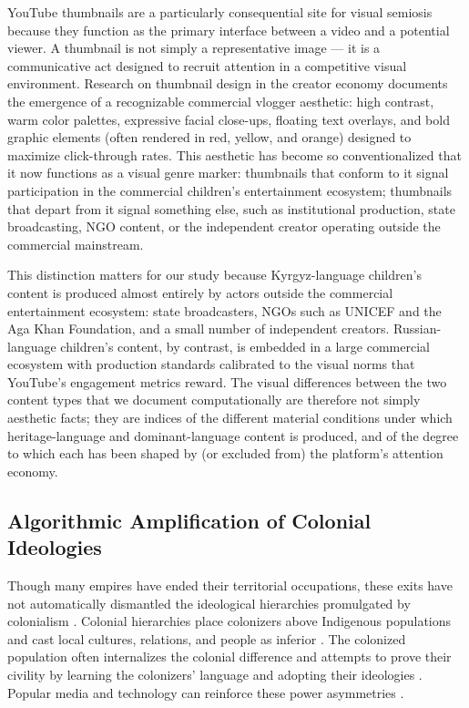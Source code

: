 \documentclass[12pt, letterpaper]{article}
\begin{document}
YouTube thumbnails are a particularly consequential site for visual semiosis because they
function as the primary interface between a video and a potential viewer. A thumbnail is not
simply a representative image --- it is a communicative act designed to recruit attention in
a competitive visual environment. Research on thumbnail design in the creator economy
documents the emergence of a recognizable commercial vlogger aesthetic: high contrast, warm
color palettes, expressive facial close-ups, floating text overlays, and bold graphic elements
(often rendered in red, yellow, and orange) designed to maximize click-through rates. This
aesthetic has become so conventionalized that it now functions as a visual genre marker:
thumbnails that conform to it signal participation in the commercial children's entertainment
ecosystem; thumbnails that depart from it signal something else, such as institutional production,
state broadcasting, NGO content, or the independent creator operating outside the commercial
mainstream.

This distinction matters for our study because Kyrgyz-language children's content is produced
almost entirely by actors outside the commercial entertainment ecosystem: state broadcasters,
NGOs such as UNICEF and the Aga Khan Foundation, and a small number of independent creators.
Russian-language children's content, by contrast, is embedded in a large commercial ecosystem
with production standards calibrated to the visual norms that YouTube's engagement metrics
reward. The visual differences between the two content types that we document computationally
are therefore not simply aesthetic facts; they are indices of the different material conditions
under which heritage-language and dominant-language content is produced, and of the degree
to which each has been shaped by (or excluded from) the platform's attention economy.

\subsection{Algorithmic Amplification of Colonial Ideologies}

Though many empires have ended their territorial occupations, these exits have not automatically dismantled the ideological hierarchies promulgated by colonialism \citep{ali2016}. Colonial hierarchies place colonizers above Indigenous populations and cast local cultures, relations, and people as inferior \citep{fanon2007}. The colonized population often internalizes the colonial difference and attempts to prove their civility by learning the colonizers’ language and adopting their ideologies \citep{fanon2007}. Popular media and technology can reinforce these power asymmetries \citep{fanon2007}.
\end{document}
